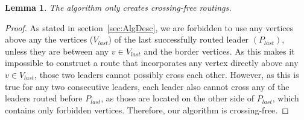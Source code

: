 \documentclass[11pt,a4paper]{vutinfth}
\newtheorem{lemma}{Lemma}
\begin{document}
\begin{lemma}
	The algorithm only creates crossing-free routings.
	\label{lem:CrosFree}
\end{lemma}
\begin{proof}
	As stated in section~\ref{sec:AlgDesc}, we are forbidden to use any vertices above any the vertices ($V_{last}$) of the last successfully routed leader $(P_{last})$, unless they are between any $v \in V_{last}$ and the border vertices. As this makes it impossible to construct a route that incorporates any vertex directly above any $v \in V_{last}$, those two leaders cannot possibly cross each other. However, as this is true for any two consecutive leaders, each leader also cannot cross any of the leaders routed before $P_{last}$, as those are located on the other side of $P_{last}$, which contains only forbidden vertices.
	Therefore, our algorithm is crossing-free.
\end{proof}
\end{document}

